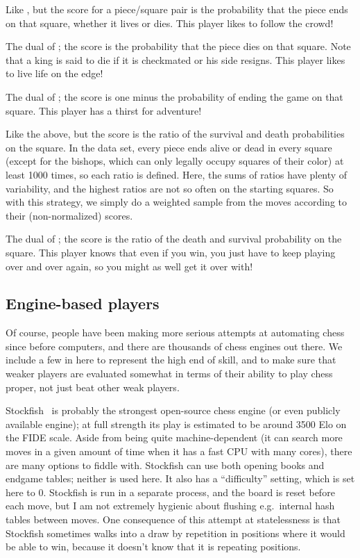 \documentclass[10pt,preprint,twocolumn]{acmart}
\begin{document}
 Like , but the score for a
piece/square pair is the probability that the piece ends on that
square, whether it lives or dies. This player likes to follow the
crowd! \stateful

 The dual of ; the score is the
probability that the piece dies on that square. Note that a king is
said to die if it is checkmated or his side resigns. This player likes
to live life on the edge! \stateful

 The dual of ; the score
is one minus the probability of ending the game on that square. This
player has a thirst for adventure! \stateful

 Like the above, but the score is the
ratio of the survival and death probabilities on the square. In the
data set, every piece ends alive or dead in every square (except
for the bishops, which can only legally occupy squares of their
color) at least 1000 times, so each ratio is defined. Here, the
sums of ratios have plenty of variability, and the highest
ratios are not so often on the starting squares. So with this
strategy, we simply do a weighted sample from the moves according
to their (non-normalized) scores. \stateful

 The dual of ; the score is
the ratio of the death and survival probability on the square. This
player knows that even if you win, you just have to keep playing over
and over again, so you might as well get it over with! \stateful

\subsection{Engine-based players}

Of course, people have been making more serious attempts at automating
chess since before computers, and there are thousands of chess engines
out there. We include a few in here to represent the high end of
skill, and to make sure that weaker players are evaluated somewhat in
terms of their ability to play chess proper, not just beat other weak
players.

 Stockfish~\cite{stockfish} is probably the
strongest open-source chess engine (or even publicly available
engine); at full strength its play is estimated to be around 3500 Elo
on the FIDE scale. Aside from being quite machine-dependent (it can
search more moves in a given amount of time when it has a fast CPU
with many cores), there are many options to fiddle with. Stockfish can
use both opening books and endgame tables; neither is used here. It
also has a ``difficulty'' setting, which is set here to 0. Stockfish
is run in a separate process, and the board is reset before each move,
but I am not extremely hygienic about flushing e.g.~internal hash
tables between moves. One consequence of this attempt at statelessness
is that Stockfish sometimes walks into a draw by repetition in
positions where it would be able to win, because it doesn't know that
it is repeating positions. \traditional
\end{document}
